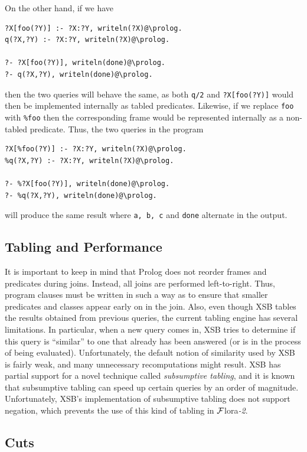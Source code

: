 \documentclass[11pt]{article}
\newcommand{\FLSYSTEM}{{\mbox{\sc ${\cal F}${lora}\rm\emph{-2}}}\xspace}
\begin{document}
On the other hand, if we have
\begin{verbatim}
?X[foo(?Y)] :- ?X:?Y, writeln(?X)@\prolog.
q(?X,?Y) :- ?X:?Y, writeln(?X)@\prolog.

?- ?X[foo(?Y)], writeln(done)@\prolog.
?- q(?X,?Y), writeln(done)@\prolog.
\end{verbatim}
then the two queries will behave the same, as both {\tt q/2} and
\verb|?X[foo(?Y)]| would then be implemented internally as tabled predicates.
Likewise, if we replace {\tt foo} with {\tt \%foo} then the corresponding
frame would be represented internally as a non-tabled predicate.
Thus, the two queries in the program
\begin{verbatim}
?X[%foo(?Y)] :- ?X:?Y, writeln(?X)@\prolog.
%q(?X,?Y) :- ?X:?Y, writeln(?X)@\prolog.

?- %?X[foo(?Y)], writeln(done)@\prolog.
?- %q(?X,?Y), writeln(done)@\prolog.
\end{verbatim}
will produce the same result where {\tt a, b, c} and {\tt done}
alternate in the output.

\subsection{Tabling and Performance}

It is important to keep in mind that Prolog does not reorder frames
and predicates during joins. Instead, all joins are performed
left-to-right.  Thus, program clauses must be written in such a way as to
ensure that smaller predicates and classes appear early on in the join.
Also, even though XSB tables the results obtained from previous queries,
the current tabling engine has several limitations. In particular, when a
new query comes in, XSB tries to determine if this query is ``similar'' to
one that already has been answered (or is in the process of being
evaluated).  Unfortunately, the default notion of similarity used by XSB is
fairly weak, and many unnecessary recomputations might result. XSB has
partial support for a
novel technique called \emph{subsumptive tabling}, and
it is known that subsumptive tabling can speed up
certain queries by an order of magnitude. Unfortunately, XSB's implementation
of subsumptive tabling does not support negation, which prevents
the use of this kind of tabling in \FLSYSTEM.


\subsection{Cuts}
\end{document}
